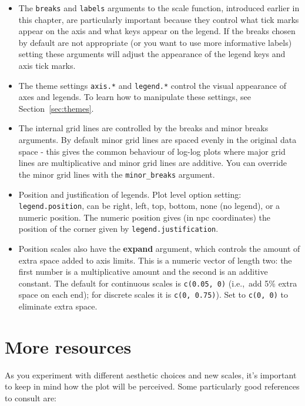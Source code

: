 \begin{itemize}
  \item The {\tt breaks} and {\tt labels} arguments to the scale function, introduced earlier in this chapter, are particularly important because they control what tick marks appear on the axis and what keys appear on the legend.  If the breaks chosen by default are not appropriate (or you want to use more informative labels) setting these arguments will adjust the appearance of the legend keys and axis tick marks.  
  
  \item The theme settings {\tt axis.*} and {\tt legend.*} control the visual appearance of axes and legends.  To learn how to manipulate these settings, see Section~\ref{sec:themes}.

  \item The internal grid lines are controlled by the breaks and minor breaks arguments.  By default minor grid lines are spaced evenly in the original data space - this gives the common behaviour of log-log plots where major grid lines are multiplicative and minor grid lines are additive.  You can override the minor grid lines with the {\tt minor\_breaks} argument.


  \item Position and justification of legends.  Plot level option setting: {\tt legend.position}, can be right, left, top, bottom, none (no legend), or a numeric position.  The numeric position gives (in npc coordinates) the position of the corner given by {\tt legend.justification}.  
  
  \item Position scales also have the {\bf expand} argument, which controls the amount of extra space added to axis limits.  This is a numeric vector of length two: the first number is a multiplicative amount and the second is an additive constant.  The default for continuous scales is {\tt c(0.05, 0)} (i.e.,\ add 5\% extra space on each end); for discrete scales it is {\tt c(0, 0.75)}).  Set to {\tt c(0, 0)} to eliminate extra space.
  
\end{itemize}

\section{More resources}
\label{sec:scale_resources}

As you experiment with different aesthetic choices and new scales, it's important to keep in mind how the plot will be perceived.   Some particularly good references to consult are:

